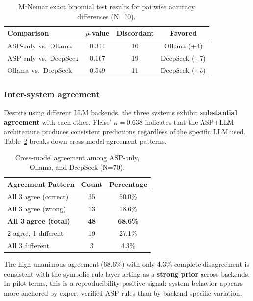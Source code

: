 \documentclass[11pt]{article}
\begin{document}
\begin{table}[h]
\centering
\begin{tabular}{lccc}
\toprule
Comparison & $p$-value & Discordant & Favored \\
\midrule
ASP-only vs.~Ollama & 0.344 & 10 & Ollama (+4) \\
ASP-only vs.~DeepSeek & 0.167 & 19 & DeepSeek (+7) \\
Ollama vs.~DeepSeek & 0.549 & 11 & DeepSeek (+3) \\
\bottomrule
\end{tabular}
\caption{McNemar exact binomial test results for pairwise accuracy differences (N=70).}
\label{tab:mcnemar}
\end{table}

\subsubsection{Inter-system agreement}

Despite using different LLM backends, the three systems exhibit \textbf{substantial agreement} with each other. Fleiss' $\kappa = 0.638$ indicates that the ASP+LLM architecture produces consistent predictions regardless of the specific LLM used. Table~\ref{tab:agreement} breaks down cross-model agreement patterns.

\begin{table}[h]
\centering
\begin{tabular}{lcc}
\toprule
Agreement Pattern & Count & Percentage \\
\midrule
All 3 agree (correct) & 35 & 50.0\% \\
All 3 agree (wrong) & 13 & 18.6\% \\
\midrule
\textbf{All 3 agree (total)} & \textbf{48} & \textbf{68.6\%} \\
2 agree, 1 different & 19 & 27.1\% \\
All 3 different & 3 & 4.3\% \\
\bottomrule
\end{tabular}
\caption{Cross-model agreement among ASP-only, Ollama, and DeepSeek (N=70).}
\label{tab:agreement}
\end{table}

The high unanimous agreement (68.6\%) with only 4.3\% complete disagreement is consistent with the symbolic rule layer acting as a \textbf{strong prior} across backends. In pilot terms, this is a reproducibility-positive signal: system behavior appears more anchored by expert-verified ASP rules than by backend-specific variation.
\end{document}
